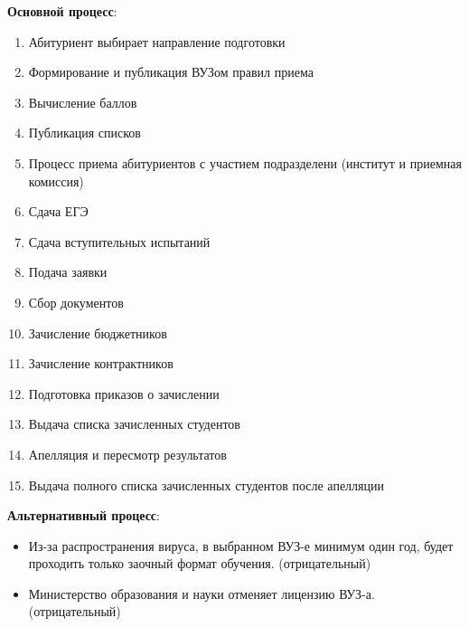 \documentclass[areasetadvanced]{scrartcl}
\begin{document}
\textbf{Основной процесс}:
\begin{enumerate}
    \item Абитуриент выбирает направление подготовки
    \item Формирование и публикация ВУЗом правил приема
    \item Вычисление баллов
    \item Публикация списков
    \item Процесс приема абитуриентов с участием подразделени (институт и приемная комиссия)
    \item Сдача ЕГЭ
    \item Сдача вступительных испытаний
    \item Подача заявки
    \item Сбор документов
    \item Зачисление бюджетников
    \item Зачисление контрактников
    \item Подготовка приказов о зачислении
    \item Выдача списка зачисленных студентов
    \item Апелляция и пересмотр результатов
    \item Выдача полного списка зачисленных студентов после апелляции
\end{enumerate}
\textbf{Альтернативный процесс}:
\begin{itemize}
    \item Из-за распространения вируса, в выбранном ВУЗ-е минимум один год, будет
проходить только заочный формат обучения. (отрицательный)
\item Министерство образования и науки отменяет лицензию ВУЗ-а. (отрицательный)
\end{itemize}
\newpage
\end{document}
